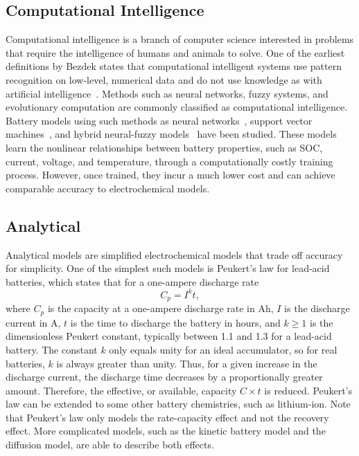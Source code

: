 \documentclass[../zhang_thesis.tex]{subfiles}
\begin{document}
\subsection{Computational Intelligence}

Computational intelligence is a branch of computer science interested in problems that require the intelligence of humans and animals to solve. One of the earliest definitions by Bezdek states that computational intelligent systems use pattern recognition on low-level, numerical data and do not use knowledge as with artificial intelligence~\cite{bezdek92,bezdek94}. Methods such as neural networks, fuzzy systems, and evolutionary computation are commonly classified as computational
intelligence. Battery models using such methods as neural networks~\cite{ogorman98,capizzi11}, support vector machines~\cite{wang06}, and hybrid neural-fuzzy models~\cite{shen02} have been studied. These models learn the nonlinear relationships between battery properties, such as SOC, current, voltage, and temperature, through a computationally costly training process. However, once trained, they incur a much lower cost and can achieve comparable accuracy to electrochemical
models.

\subsection{Analytical}

Analytical models are simplified electrochemical models that trade off accuracy for simplicity. One of the simplest such models is Peukert's law for lead-acid batteries, which states that for a one-ampere discharge rate~\cite{doerffel06}
\begin{equation}
C_p = I^k t,
\end{equation}
where $C_p$ is the capacity at a one-ampere discharge rate in Ah, $I$ is the discharge current in A, $t$ is the time to discharge the battery in hours, and $k\ge 1$ is the dimensionless Peukert constant, typically between 1.1 and 1.3 for a lead-acid battery. The constant $k$ only equals unity for an ideal accumulator, so for real batteries, $k$ is always greater than unity. Thus, for a given increase in the discharge current, the discharge time decreases by a proportionally greater
amount. Therefore, the effective, or available, capacity $C\times t$ is reduced. Peukert's law can be extended to some other battery chemistries, such as lithium-ion. Note that Peukert's law only models the rate-capacity effect and not the recovery effect. More complicated models, such as the kinetic battery model and the diffusion model, are able to describe both effects.
\end{document}
